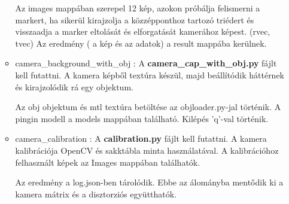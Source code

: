 \begin{itemize}
\begin{itemize}
Az images mappában szerepel 12 kép, azokon próbálja felismerni a markert, ha sikerül kirajzolja a közzépponthoz
tartozó triédert és visszaadja a marker eltolását és elforgatását kamerához képest. (rvec, tvec)
Az eredmény ( a kép és az adatok) a result mappába kerülnek.
\item camera\_background\_with\_obj :
A \textbf{camera\_cap\_with\_obj.py} fájlt kell futattni.
A kamera képből textúra készül, majd beállítódik háttérnek és kirajzolódik rá egy objektum.

Az obj objektum és mtl textúra betöltése az objloader.py-jal történik.
A pingin modell a models mappában található.
Kilépés 'q'-val történik.
\item camera\_calibration :
A \textbf{calibration.py} fájlt kell futattni.
A kamera kalibrációja OpenCV és sakktábla minta használatával.
A kalibrációhoz felhasznált képek az Images mappában találhatók.

Az eredmény a log.json-ben tárolódik.
Ebbe az álományba mentődik ki a kamera mátrix és a disztorziós együtthatók.


\end{itemize}
\end{itemize}
